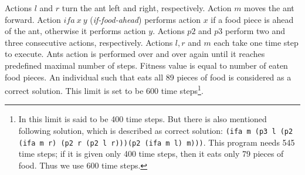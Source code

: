 \documentclass[conference]{IEEEtran}
\begin{document}
Actions $l$ and $r$ turn the ant left and right, respectively. 
Action $m$ moves the ant forward.
Action $ifa~x~y$ \mbox{(\textit{if-food-ahead})} 
performs action $x$ if a food piece is ahead of the ant,
otherwise it performs action $y$.
Actions $p2$ and $p3$ perform two and three consecutive actions, respectively.
Actions $l, r$ and $m$ each take one time step to execute.
Ants action is performed over and over again until it reaches predefined
maximal number of steps. 
Fitness value is equal to number of eaten food pieces.
An individual such that eats all 89 pieces of food is 
considered as a correct solution.
This limit is set to be 600 time steps\footnote{
In \cite{koza92} this limit is said to be 400 time steps.
But there is also mentioned following solution, 
which is described as correct solution:
\texttt{(ifa m (p3 l (p2 (ifa m r) (p2 r (p2 l r)))(p2 (ifa m l) m)))}.
This program needs 545
time steps; if it is given only 400 time steps, then it eats only 79 pieces
of food. Thus we use 600 time steps. 
}.
\end{document}
